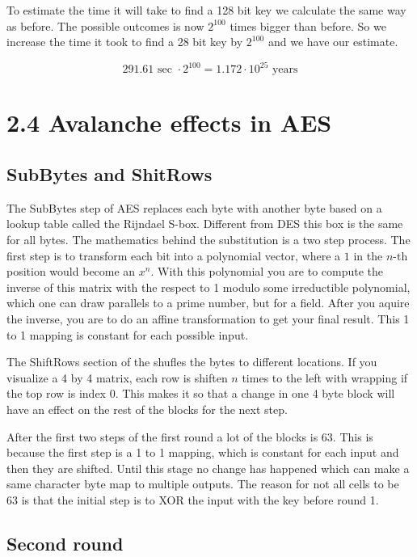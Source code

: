 To estimate the time it will take to find a 128 bit key we calculate the same way as before.
The possible outcomes is now $2^{100}$ times bigger than before.
So we increase the time it took to find a 28 bit key by $2^{100}$ and we have our estimate.

$$ 291.61 \text{ sec } \cdot 2^{100} = 1.172 \cdot 10^{25} \text{ years} $$

\section*{2.4 Avalanche effects in AES}

\subsection*{SubBytes and ShitRows}

The SubBytes step of AES replaces each byte with another byte based on a lookup table called the Rijndael S-box.
Different from DES this box is the same for all bytes.
The mathematics behind the substitution is a two step process.
The first step is to transform each bit into a polynomial vector, where a $1$ in the $n\text{-th}$ position would become an $x^{n}$.
With this polynomial you are to compute the inverse of this matrix with the respect to 1 modulo some irreductible polynomial, which one can draw parallels to a prime number, but for a field.
After you aquire the inverse, you are to do an affine transformation to get your final result.
This 1 to 1 mapping is constant for each possible input.

The ShiftRows section of the shufles the bytes to different locations.
If you visualize a 4 by 4 matrix, each row is shiften $n$ times to the left with wrapping if the top row is index 0.
This makes it so that a change in one 4 byte block will have an effect on the rest of the blocks for the next step.

After the first two steps of the first round a lot of the blocks is 63.
This is because the first step is a 1 to 1 mapping, which is constant for each input and then they are shifted.
Until this stage no change has happened which can make a same character byte map to multiple outputs.
The reason for not all cells to be 63 is that the initial step is to XOR the input with the key before round 1.

\subsection*{Second round}

